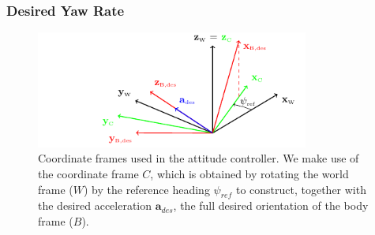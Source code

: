 \documentclass[10pt,a4paper,fleqn]{article}
\newcommand{\yawRef}{\ensuremath{\psi_{ref}}}
\newcommand{\bVec}[1]{\mathbf{#1}}
\newcommand{\wfr}[0]{\ensuremath{W}} %
\newcommand{\bfr}[0]{\ensuremath{B}} %
\begin{document}
\subsubsection*{Desired Yaw Rate} \label{sec:yaw_control}

\begin{figure}[t]
   \centering
   \includegraphics[width=0.8\textwidth]{img/coordinate_systems.pdf}
   \caption{Coordinate frames used in the attitude controller.
  We make use of the coordinate frame $C$, which is obtained by rotating the world frame ($\wfr$) by the reference heading $\yawRef$ to construct, together with the desired acceleration $\bVec{a}_{des}$, the full desired orientation of the body frame ($\bfr$).}
   \label{fig:att_cont_frames}
\end{figure}
\end{document}
